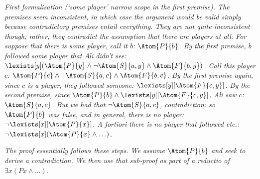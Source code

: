 \documentclass[../../../include/open-logic-section]{subfiles}
\begin{document}
\begin{prob}
\begin{ans}
    \emph{First formalisation (`some player' narrow scope in the
    first premise). The premises seem inconsistent, in which case the
    argument would be valid simply because contradictory premises
    entail everything. They are not quite inconsistent though; rather,
    they contradict the assumption that there are players at all. For
    suppose that there is some player, call it $b$: $\Atom{P}{b}$. By
    the first premise, $b$ followed some player that Ali didn't see:
    $\lexists[y](\Atom{P}{y}\land\lnot\Atom{S}{a,y}\land\Atom{F}{b,y})$.
    Call this player $c$: $\Atom{P}{c}\land\lnot \Atom{S}{a,c}\land
    \Atom{F}{b,c}$. By the first premise again, since $c$ is a player,
    they followed someone: $\lexists[y][\Atom{F}{c,y}]$. By the second
    premise, since $\Atom{P}{b}\land\lexists[y][\Atom{F}{c,y}]$, Ali
    saw $c$: $\Atom{S}{a,c}$. But we had that $\lnot\Atom{S}{a,c}$,
    contradiction: so $\Atom{P}{b}$ was false, and in general, there
    is no player: $\lnot\lexists[x][\Atom{P}{x}]$. A fortiori there is no player
    that followed etc.: $\lnot\lexists[x](\Atom{P}{x}\land\ldots)$.}

    \emph{The proof essentially follows these steps.
    We assume $\Atom{P}{b}$ and seek to derive a contradiction. We
    then use that sub-proof as part of a \emph{reductio} of $\exists
    x(Px\land\ldots)$.}


\end{ans}
\end{prob}
\end{document}
